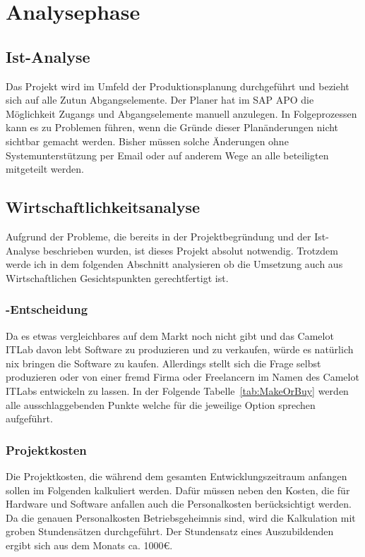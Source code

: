 \section{Analysephase} 
\label{sec:Analysephase}

\subsection{Ist-Analyse} 
\label{sec:IstAnalyse}
Das Projekt wird im Umfeld der Produktionsplanung durchgeführt und bezieht sich auf alle Zutun Abgangselemente. Der Planer hat im SAP \ac{APO} die	Möglichkeit Zugangs und Abgangselemente manuell anzulegen. In Folgeprozessen kann es zu	Problemen führen, wenn die Gründe dieser Planänderungen nicht sichtbar gemacht werden. Bisher müssen solche Änderungen ohne Systemunterstützung per Email oder auf anderem Wege an alle beteiligten mitgeteilt werden.

\subsection{Wirtschaftlichkeitsanalyse}
\label{sec:Wirtschaftlichkeitsanalyse}
Aufgrund der Probleme, die bereits in der Projektbegründung und der Ist-Analyse beschrieben wurden, ist dieses Projekt absolut notwendig. Trotzdem werde ich in dem folgenden Abschnitt analysieren ob die Umsetzung auch aus Wirtschaftlichen Gesichtspunkten gerechtfertigt ist.

\subsubsection{-Entscheidung}
\label{sec:MakeOrBuyEntscheidung}

Da es etwas vergleichbares auf dem Markt noch nicht gibt und das Camelot ITLab davon lebt Software zu produzieren und zu verkaufen, würde es natürlich nix bringen die Software zu kaufen. Allerdings stellt sich die Frage selbst produzieren oder von einer fremd Firma oder Freelancern im Namen des Camelot ITLabs entwickeln zu lassen. In der Folgende Tabelle~\ref{tab:MakeOrBuy} werden alle ausschlaggebenden Punkte welche für die jeweilige Option sprechen aufgeführt.

\subsubsection{Projektkosten}
\label{sec:Projektkosten}
Die Projektkosten, die während dem gesamten Entwicklungszeitraum anfangen sollen im Folgenden kalkuliert werden. Dafür müssen neben den Kosten, die für Hardware und Software anfallen auch die Personalkosten berücksichtigt werden. Da die genauen Personalkosten Betriebsgeheimnis sind, wird die Kalkulation mit groben Stundensätzen durchgeführt. Der Stundensatz eines Auszubildenden ergibt sich aus dem Monats ca. 1000€.
		
